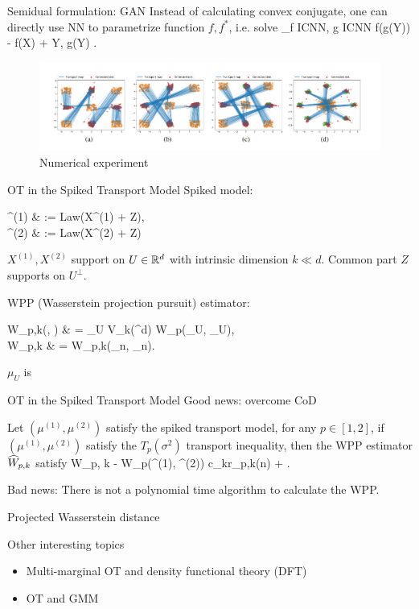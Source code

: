 \documentclass{beamer}
\begin{document}
\begin{frame}{Semidual formulation: GAN\footnotemark}
	Instead of calculating convex conjugate, one can directly use NN to parametrize function $f, f^*$, i.e. solve
	\bequn
		\inf_{f \in ICNN, g \in ICNN} \mbE\lb f(\nabla g(Y)) - f(X) + \la Y, \nabla g(Y) \ra \rb.
	\eequn
	\begin{figure}[H]
          \centering
          \centerline{\includegraphics[width=1.2\linewidth]{GAN.png}}
          \caption{Numerical experiment}
        \end{figure}
\end{frame}


\begin{frame}{OT in the Spiked Transport Model}
	Spiked model:
	\bequn
		\begin{aligned}
			\mu^{(1)} & := Law(X^{(1)} + Z),		\\
			\mu^{(2)} & := Law(X^{(2)} + Z)
		\end{aligned}
	\eequn
	$X^{(1)}, X^{(2)}$ support on $U \in \mathbb{R}^d$ with intrinsic dimension $k \ll d$. Common part $Z$ supports on $U^{\perp}$.
	\par
	WPP (Wasserstein projection pursuit) estimator:
	\bequn
		\begin{aligned}
		\wtd W_{p,k}(\mu, \nu) & = \max_{U \in V_k(\mbR^d)} W_p(\mu_U, \nu_U),		\\
		\wht W_{p,k} & = \wtd W_{p,k}(\mu_n, \nu_n).
		\end{aligned}
	\eequn
	$\mu_U$ is 
	
\end{frame}


\begin{frame}{OT in the Spiked Transport Model}
	Good news: overcome CoD
	\begin{Thm}
		Let $(\mu^{(1)}, \mu^{(2)})$ satisfy the spiked transport model, for any $p \in [1, 2]$, if $(\mu^{(1)}, \mu^{(2)})$ satisfy the $T_p(\sigma^2)$ transport inequality, then the WPP estimator $\widehat W_{p, k}$ satisfy
		\bequn
			\mbE \lv \wht W_{p, k} - W_p(\mu^{(1)}, \mu^{(2)}) \rv \leq c_k\lp r_{p,k}(n) + \sqrt{\frac{d\log n}{n}} \rp.
		\eequn
	\end{Thm}
	Bad news:
		There is not a polynomial time algorithm to calculate the WPP.
\end{frame}


\begin{frame}{Projected Wasserstein distance}
\end{frame}


\begin{frame}{Other interesting topics}
\begin{itemize}
	\item Multi-marginal OT and density functional theory (DFT)
	\item OT and GMM
\end{itemize}

\end{frame}
\end{document}
